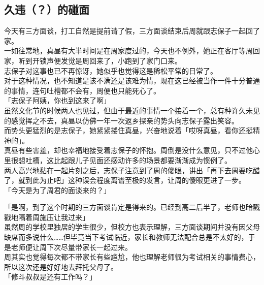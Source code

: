 \subsection{久违（？）的碰面}

今天有三方面谈，打工自然是提前请了假，三方面谈结束后周就跟志保子一起回了家。\\

一如往常地，真昼有大半时间是在周家度过的，今天也不例外，她正在客厅等周回家，听到开锁声便发觉是周回来了，小跑到了家门口来。\\

志保子对这事也已不再惊讶，她似乎也觉得这是稀松平常的日常了。\\

对于这种情况，也不知道是该不满还是该难为情，现在这已经被当作一件十分普通的事情，连句吐槽都不会有，周便也只能死心了。\\

「志保子阿姨，你也到这来了啊」\\

虽然文化节的时候两人也见过，但由于最近的事情一个接着一个，总有种许久未见的感觉挥之不去，真昼以仿佛一年一次返乡探亲的势头向志保子露出笑容。\\

而势头更猛烈的是志保子，她紧紧搂住真昼，兴奋地说着「哎呀真昼，看你还挺精神的」。\\

真昼有些害羞，却也幸福地接受着志保子的怀抱。周倒是没什么意见，只不过他心里很想吐槽，这比起跟儿子见面还感动许多的场景都要渐渐成为惯例了。\\

两人高兴地黏在一起片刻之后，志保子注意到了周的傻眼，讲出「再下去周要吃醋了，就到此为止吧」这种误会程度离谱至极的发言，让周的傻眼更进了一步。\\

「今天是为了周君的面谈来的？」

「是啊，到了这个时期的三方面谈肯定是得来的。已经到高二后半了，老师也暗戳戳地隔着周施压让我过来」\\

虽然周的学校里独居的学生很少，但校方也表示理解，三方面谈期间并没有因父母缺席而多说什么……但毕竟当下考试临近，家长和教师无法配合总是不太好的，于是老师便让周下次尽量带家长一起过来。\\

周其实也觉得每次都不带家长有些尴尬，他也理解老师很为考试相关的事情费心，所以这次还是好好地去拜托父母了。\\

「修斗叔叔是还有工作吗？」

